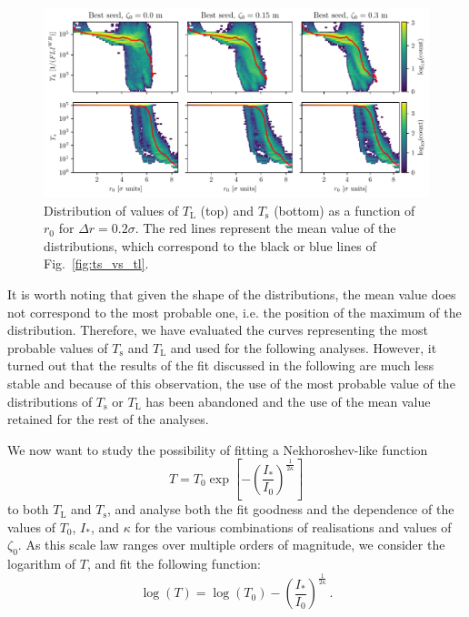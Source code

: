 \begin{figure}
    \centering
    \includegraphics[width=1\textwidth]{6_lhc_dynamic_indicators/figs/dist_and_mean.pdf}
    \caption{Distribution of values of $T_\mathrm{L}$ (top) and $T_\mathrm{s}$ (bottom) as a function of $r_0$ for $\Delta r = 0.2\sigma$. The red lines represent the mean value of the distributions, which correspond to the black or blue lines of Fig.~\ref{fig:ts_vs_tl}.}
    \label{fig:extra_distribution}
\end{figure}

It is worth noting that given the shape of the distributions, the mean value does not correspond to the most probable one, i.e. the position of the maximum of the distribution. Therefore, we have evaluated the curves representing the most probable values of $T_\mathrm{s}$ and $T_\mathrm{L}$ and used for the following analyses. However, it turned out that the results of the fit discussed in the following are much less stable and because of this observation, the use of the most probable value of the distributions of $T_\mathrm{s}$ or $T_\mathrm{L}$ has been abandoned and the use of the mean value retained for the rest of the analyses.   

We now want to study the possibility of fitting a Nekhoroshev-like function
\begin{equation}
    T = T_0 \exp\left[-\left(\frac{I_\ast}{I_0}\right)^{\frac{1}{2\kappa}}\right]
\end{equation} 
to both $T_\mathrm{L}$ and $T_\mathrm{s}$, and analyse both the fit goodness and the dependence of the values of $T_0$, $I_\ast$, and $\kappa$ for the various combinations of realisations and values of $\zeta_0$. As this scale law ranges over multiple orders of magnitude, we consider the logarithm of $T$, and fit the following function:
\begin{equation}
    \log(T) = \log(T_0) - \left(\frac{I_\ast}{I_0}\right)^{\frac{1}{2\kappa}} \,.
\end{equation}

